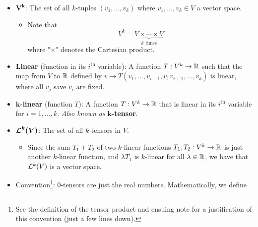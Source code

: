 \documentclass[../notes.tex]{subfiles}
\begin{document}
\begin{itemize}
\begin{proof}
        By the definition of $[a_{i,j}]$ and $[c_{j,i}]$, we have that
        \begin{align*}
            A^*f_i^* &= \sum_{k=1}^nc_{k,i}e_k^*&
            Ae_j &= \sum_{k=1}^ma_{k,j}f_k
        \end{align*}
        It follows that
        \begin{equation*}
            [A^*f_i^*](e_j) = \left[ \sum_{k=1}^nc_{k,i}e_k^* \right](e_j)
            = c_{j,i}
        \end{equation*}
        and
        \begin{equation*}
            [A^*f_i^*](e_j) = f_i^*(Ae_j)
            = f_i^*\left( \sum_{k=1}^ma_{k,j}f_k \right)
            = a_{i,j}
        \end{equation*}
        so transitivity implies the desired result.
    \end{proof}
    \item {}$\bm{V^k}$: The set of all $k$-tuples $(v_1,\dots,v_k)$ where $v_1,\dots,v_k\in V$ a vector space.
    \begin{itemize}
        \item Note that
        \begin{equation*}
            V^k = \underbrace{V\times\cdots\times V}_{k\text{ times}}
        \end{equation*}
        where "$\times$" denotes the Cartesian product.
    \end{itemize}
    \item \textbf{Linear} (function in its $i^\text{th}$ variable): A function $T:V^k\to\R$ such that the map from $V$ to $\R$ defined by $v\mapsto T(v_1,\dots,v_{i-1},v,v_{i+1},\dots,v_k)$ is linear, where all $v_j$ save $v_i$ are fixed.
    \item \textbf{$\bm{k}$-linear} (function $T$): A function $T:V^k\to\R$ that is linear in its $i^\text{th}$ variable for $i=1,\dots,k$. \emph{Also known as} \textbf{$\bm{k}$-tensor}.
    \item $\bm{\lin[k]{V}}$: The set of all $k$-tensors in $V$.
    \begin{itemize}
        \item Since the sum $T_1+T_2$ of two $k$-linear functions $T_1,T_2:V^k\to\R$ is just another $k$-linear function, and $\lambda T_1$ is $k$-linear for all $\lambda\in\R$, we have that $\lin[k]{V}$ is a vector space.
    \end{itemize}
    \item Convention\footnote{See the definition of the tensor product and ensuing note for a justification of this convention (just a few lines down).}: 0-tensors are just the real numbers. Mathematically, we define

\end{itemize}
\end{document}
